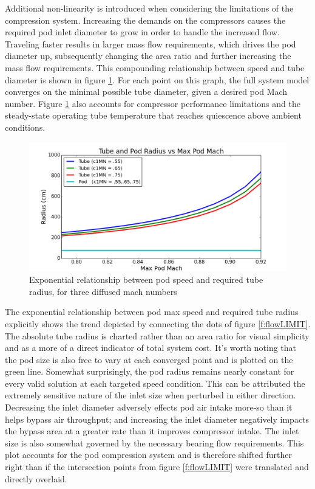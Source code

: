 \documentclass[heading.tex]{subfiles}
\begin{document}
 Additional non-linearity is introduced when
considering the limitations of the compression system. Increasing the demands on the compressors
causes the required pod inlet diameter to grow in order to handle the increased flow. Traveling faster results in larger mass flow requirements,
which drives the pod diameter up, subsequently changing the area ratio and further increasing the mass flow requirements.
This compounding relationship between 
speed and tube diameter is shown in figure \ref{f:machRAD}. For each point on this graph, the full system model converges on the minimal
possible tube diameter, given a desired pod Mach number. Figure \ref{f:machRAD} also accounts for compressor performance limitations and
the steady-state operating tube temperature that reaches quiescence above ambient conditions.


\begin{figure}[hbtp]
\centering
\includegraphics[width=\textwidth]{images/mach_vs_rad4.png}
\caption[Tube and Pod Radius vs Mach]{Exponential relationship between pod speed and required tube radius, for three diffused mach numbers}
\label{f:machRAD}
\end{figure}

The exponential relationship between pod max speed and required tube radius explicitly shows the trend depicted by
connecting the dots of figure \ref{f:flowLIMIT}. The absolute tube radius is charted rather than an area ratio for visual simplicity
and as a more of a direct indicator of total system cost. It's worth noting that the pod size is also free to vary at each converged point
and is plotted on the green line. Somewhat surprisingly, the pod radius remains
nearly constant for every valid solution at each targeted speed condition. This can be attributed the extremely sensitive nature of the inlet
size when perturbed in either direction. Decreasing the inlet diameter adversely effects pod air intake more-so than it helps
bypass air throughput; and increasing the inlet diameter negatively impacts the bypass area at a greater rate than it improves
compressor intake. The inlet size is also somewhat governed by the
necessary bearing flow requirements. This plot accounts for
the pod compression system and is therefore shifted further right than if the intersection points from figure \ref{f:flowLIMIT}
were translated and directly overlaid. 
\end{document}
